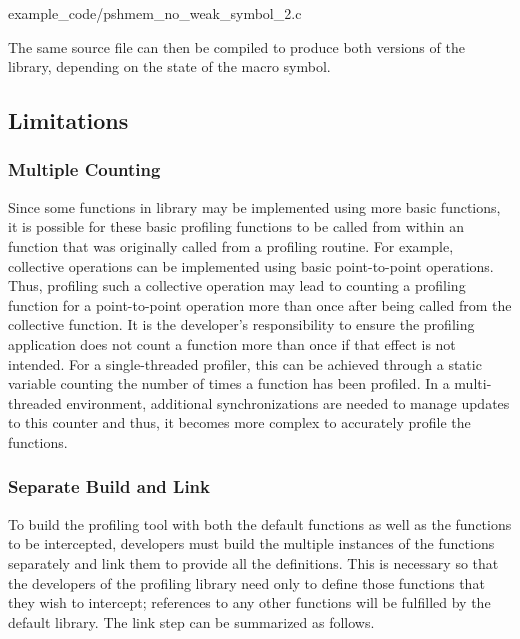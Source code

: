
      {example_code/pshmem_no_weak_symbol_2.c}

The same source file can then be compiled to produce both versions 
of the library, depending on the state of the 
 macro symbol.

\subsection{Limitations}
\label{sec:pshmem_limitations}

\subsubsection{Multiple Counting}
\label{sec:pshmem_multiple_count}
Since some functions in \openshmem library may be implemented 
using more basic \openshmem functions, it is possible for these basic  
profiling functions to be called from within an \openshmem function 
that was originally called from a profiling routine. For example, 
\openshmem collective operations can be implemented using basic 
point-to-point operations. Thus, profiling such a collective 
operation may lead to counting a profiling function for a
point-to-point operation more than once after being called from the 
collective function. It is the developer's responsibility to ensure 
the profiling application does not count a function more than once if 
that effect is not intended. For a single-threaded profiler, this 
can be achieved through a static variable counting the number of 
times a function has been profiled. In a multi-threaded environment, 
additional synchronizations are needed to manage updates to this 
counter and thus, it becomes more complex to accurately profile the 
\openshmem functions.

\subsubsection{Separate Build and Link}
\label{sec:pshmem_separate_build_link}
To build the profiling tool with both the default \openshmem
functions as well as the \openshmem functions to be intercepted, 
developers must build the multiple instances of the \openshmem
functions separately and link them to provide all the definitions. 
This is necessary so that the developers of the profiling library 
need only to define those \openshmem functions that they wish 
to intercept; references to any other functions will be fulfilled 
by the default \openshmem library. The link step can be summarized 
as follows. \\

